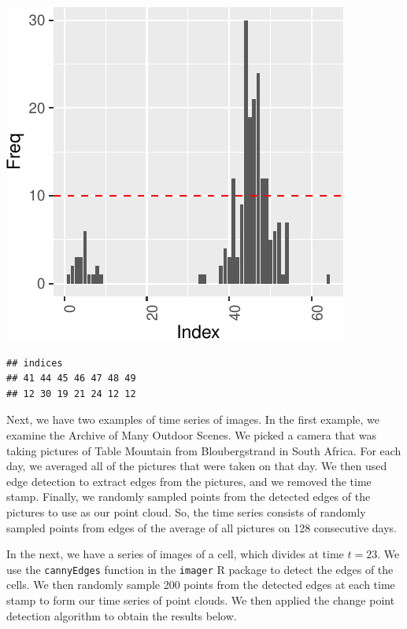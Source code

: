 \documentclass[smallextended]{svjour3}       %
\begin{document}
\begin{center}\includegraphics{springer_template_files/figure-latex/unnamed-chunk-7-4} \end{center}

\begin{verbatim}
## indices
## 41 44 45 46 47 48 49 
## 12 30 19 21 24 12 12
\end{verbatim}

Next, we have two examples of time series of images. In the first
example, we examine the Archive of Many Outdoor Scenes. We picked a
camera that was taking pictures of Table Mountain from Bloubergstrand in
South Africa. For each day, we averaged all of the pictures that were
taken on that day. We then used edge detection to extract edges from the
pictures, and we removed the time stamp. Finally, we randomly sampled
points from the detected edges of the pictures to use as our point
cloud. So, the time series consists of randomly sampled points from
edges of the average of all pictures on 128 consecutive days.

In the next, we have a series of images of a cell, which divides at time
\(t = 23\). We use the \texttt{cannyEdges} function in the
\texttt{imager} R package to detect the edges of the cells. We then
randomly sample 200 points from the detected edges at each time stamp to
form our time series of point clouds. We then applied the change point
detection algorithm to obtain the results below.
\end{document}
